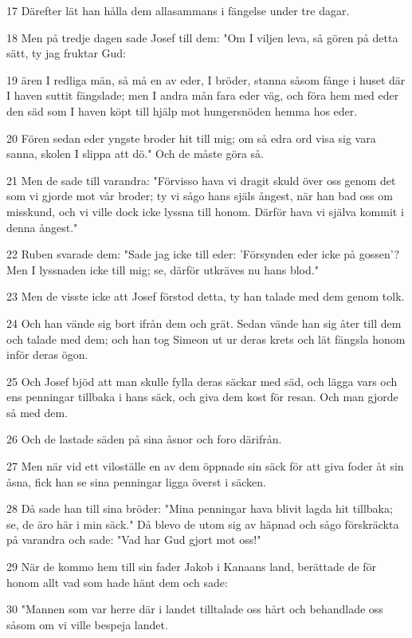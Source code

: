 \par 17 Därefter lät han hålla dem allasammans i fängelse under tre dagar.
\par 18 Men på tredje dagen sade Josef till dem: "Om I viljen leva, så gören på detta sätt, ty jag fruktar Gud:
\par 19 ären I redliga män, så må en av eder, I bröder, stanna såsom fånge i huset där I haven suttit fängslade; men I andra mån fara eder väg, och föra hem med eder den säd som I haven köpt till hjälp mot hungersnöden hemma hos eder.
\par 20 Fören sedan eder yngste broder hit till mig; om så edra ord visa sig vara sanna, skolen I slippa att dö." Och de måste göra så.
\par 21 Men de sade till varandra: "Förvisso hava vi dragit skuld över oss genom det som vi gjorde mot vår broder; ty vi sågo hans själs ångest, när han bad oss om misskund, och vi ville dock icke lyssna till honom. Därför hava vi själva kommit i denna ångest."
\par 22 Ruben svarade dem: "Sade jag icke till eder: 'Försynden eder icke på gossen'? Men I lyssnaden icke till mig; se, därför utkräves nu hans blod."
\par 23 Men de visste icke att Josef förstod detta, ty han talade med dem genom tolk.
\par 24 Och han vände sig bort ifrån dem och grät. Sedan vände han sig åter till dem och talade med dem; och han tog Simeon ut ur deras krets och lät fängsla honom inför deras ögon.
\par 25 Och Josef bjöd att man skulle fylla deras säckar med säd, och lägga vars och ens penningar tillbaka i hans säck, och giva dem kost för resan. Och man gjorde så med dem.
\par 26 Och de lastade säden på sina åsnor och foro därifrån.
\par 27 Men när vid ett viloställe en av dem öppnade sin säck för att giva foder åt sin åsna, fick han se sina penningar ligga överst i säcken.
\par 28 Då sade han till sina bröder: "Mina penningar hava blivit lagda hit tillbaka; se, de äro här i min säck." Då blevo de utom sig av häpnad och sågo förskräckta på varandra och sade: "Vad har Gud gjort mot oss!"
\par 29 När de kommo hem till sin fader Jakob i Kanaans land, berättade de för honom allt vad som hade hänt dem och sade:
\par 30 "Mannen som var herre där i landet tilltalade oss hårt och behandlade oss såsom om vi ville bespeja landet.
